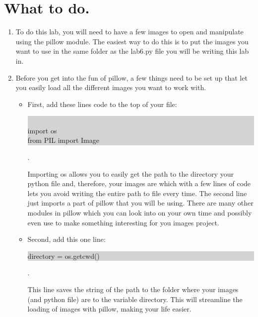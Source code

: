 \documentclass[11pt, letterpaper, onecolumn, oneside, final]{article}
\begin{document}
\section{What to do.}
\begin{enumerate}

    \item To do this lab, you will need to have a few images to open and manipulate using the  {\consolas pillow} module. The easiest way to do this is to put the images you want to use in the same folder as the {\consolas lab6.py} file you will be writing this lab in.

    \item Before you get into the fun of {\consolas pillow}, a few things need to be set up that let you easily load all the different images you want to work with. 
    \begin{itemize}
        \item First, add these lines code to the top of your file:
    \begin{center}
    \colorbox{lightgray}{\parbox{.27\textwidth}{\consolas\\
    import os\\
    from PIL import Image}}.
    \end{center}
    Importing {\consolas os} allows you to easily get the path to the directory your python file and, therefore, your images are which with a few lines of code lets you avoid writing the entire path to file every time. The second line just imports a part of {\consolas pillow} that you will be using. There are many other modules in {\consolas pillow} which you can look into on your own time and possibly even use to make something interesting for you images project.
    
    
    \item Second, add this one line:
    \begin{center}
        \colorbox{lightgray}{\parbox{.29\textwidth}{\consolas directory = os.getcwd()}}.
    \end{center}
    This line saves the string of the path to the folder where your images (and python file) are to the variable {\consolas directory}. This will streamline the loading of images with {\consolas pillow}, making your life easier.
    \end{itemize}
\end{enumerate}
\end{document}
